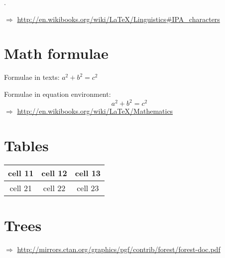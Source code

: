 \ex. 

$\Rightarrow$ \url{http://en.wikibooks.org/wiki/LaTeX/Linguistics#IPA_characters}

\section{Math formulae}

Formulae in texts: $a^2 + b^2 = c^2$

\noindent Formulae in equation environment:
\begin{equation}
a^2 + b^2 = c^2
\end{equation}
$\Rightarrow$ \url{http://en.wikibooks.org/wiki/LaTeX/Mathematics}

\section{Tables}

\begin{tabular}{c|c|c}
\hline
cell 11 & cell 12 & cell 13 \\
\hline
cell 21 & cell 22 & cell 23 \\
\hline
\end{tabular}

\section{Trees}




\noindent $\Rightarrow$ \url{http://mirrors.ctan.org/graphics/pgf/contrib/forest/forest-doc.pdf}
